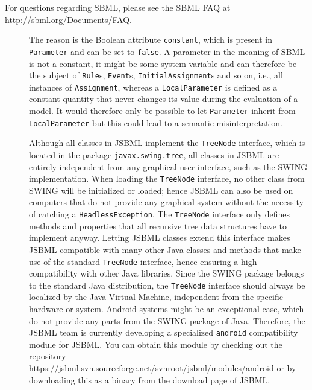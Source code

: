 For questions regarding SBML, please see the SBML FAQ at
\url{http://sbml.org/Documents/FAQ}.
\begin{description}
\item[\parbox{\textwidth}{Why does the class \texttt{LocalParameter} not inherit
from \texttt{Parameter}?}]
The reason is the Boolean
attribute \texttt{constant}, which is present in
\texttt{Parameter} and can be set to \texttt{false}. A parameter in the meaning
of SBML is not a constant, it might be some system variable
and can therefore be the subject of \texttt{Rule}s,
\texttt{Event}s, \texttt{InitialAssignment}s
and so on, i.e., all instances of \texttt{Assignment},
whereas a \texttt{LocalParameter} is defined as a constant quantity that never
changes its value during the evaluation of a model. It would
therefore only be possible to let \texttt{Parameter} inherit from
\texttt{LocalParameter} but this could lead to a semantic misinterpretation.

\item[\parbox{\textwidth}{Does JSBML depend on SWING or any particular graphical
user interface implementation?}]
Although all classes in JSBML implement the \texttt{TreeNode} interface, which
is located in the package \texttt{javax.swing.tree}, all classes in JSBML are
entirely independent from any graphical user interface, such as the
SWING implementation. When
loading the \texttt{TreeNode} interface, no other class from SWING will be
initialized or loaded; hence JSBML can also be used on computers that do not
provide any graphical system without the necessity of catching a
\texttt{HeadlessException}. The \texttt{TreeNode} interface only defines
methods and properties that all recursive tree data structures have to
implement anyway. Letting JSBML classes extend this interface makes JSBML
compatible with many other Java classes and methods that make use of the
standard \texttt{TreeNode} interface, hence ensuring a high compatibility with
other Java libraries. Since the SWING package belongs to the standard
Java\texttrademark{} distribution, the \texttt{TreeNode} interface should
always be localized by the Java Virtual Machine, independent from the specific
hardware or system. Android systems might be an exceptional case,
which do not provide any parts from the SWING package of Java. Therefore, the JSBML
team is currently developing a specialized \texttt{android} compatibility
module for JSBML. You can obtain this module by checking out the repository
\url{https://jsbml.svn.sourceforge.net/svnroot/jsbml/modules/android} or by
downloading this as a binary from the download page of JSBML.


\end{description}
